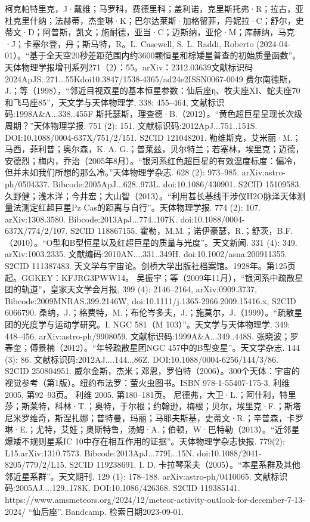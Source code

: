 \begin{enumerate}
 柯克帕特里克，J·戴维；马罗科，费德里科；盖利诺，克里斯托弗·R；拉古，亚杜克里什纳；法赫蒂，杰奎琳·K；巴尔达莱斯·加格留菲，丹妮拉·C；舒尔，史蒂文·D；阿普斯，凯文；施耐德，亚当·C；迈斯纳，亚伦·M；库赫纳，马克·J；卡塞尔登，丹；斯马特，R。L. Casewell, S. L. Raddi, Roberto (2024-04-01）。“基于全天空20秒差距范围内约3600颗恒星和棕矮星普查的初始质量函数”。天体物理学报增刊系列271（2）：55。arXiv：2312.03639文献标识码2024ApJS..271...55Kdoi10.3847/1538-4365/ad24e2ISSN0067-0049
 费尔南德斯，J.；等（1998），“邻近目视双星的基本恒星参数：仙后座η、牧夫座XI、蛇夫座70和飞马座85”，天文学与天体物理学, 338: 455–464, 文献标识码:1998A&A...338..455F
 斯托瑟斯，理查德·B.（2012）。“黄色超巨星呈现长次级周期？”天体物理学报. 751 (2): 151. 文献标识码:2012ApJ...751..151S. DOI:10.1088/0004-637X/751/2/151. S2CID 121048201.
 勒维斯克，艾米丽·M.；马西，菲利普；奥尔森，K. A. G.；普莱兹，贝尔特兰；若塞林，埃里克；迈德，安德烈；梅内，乔治（2005年8月）。“银河系红色超巨星的有效温度标度：偏冷，但并未如我们所想的那么冷。”天体物理学杂志. 628 (2): 973–985. arXiv:astro-ph/0504337. Bibcode:2005ApJ...628..973L. doi:10.1086/430901. S2CID 15109583.
 久野健；浅木洋；今井宏；大山智（2013）。“利用甚长基线干涉仪H2O脉泽天体测量法测定红超巨星Pz Cas的距离与自行”。天体物理学报. 774 (2): 107. arXiv:1308.3580. Bibcode:2013ApJ...774..107K. doi:10.1088/0004-637X/774/2/107. S2CID 118867155.
 霍勒，M.M.；诺伊豪瑟，R.；舒茨，B.F.（2010）。“O型和B型恒星以及红超巨星的质量与光度”。天文新闻. 331 (4): 349. arXiv:1003.2335. 文献编码:2010AN....331..349H. doi:10.1002/asna.200911355. S2CID 111387483.
 天文学与宇宙论。剑桥大学出版社档案馆。1928年。第125页起。GGKEY：KFJRG3PWW14。
 吴振宇；等（2009年11月），“银河系中疏散星团的轨道”，皇家天文学会月报, 399 (4): 2146–2164, arXiv:0909.3737, Bibcode:2009MNRAS.399.2146W, doi:10.1111/j.1365-2966.2009.15416.x, S2CID 6066790.
 桑纳，J.；格费特，M.；布伦岑多夫，J.；施莫尔，J.（1999）。“疏散星团的光度学与运动学研究。I. NGC 581（M 103）”。天文学与天体物理学. 349: 448–456. arXiv:astro-ph/9908059. 文献标识码:1999A&A...349..448S.
 张晓波；罗春奎；傅景楠（2012）。“年轻疏散星团NGC 457中的B型变星”。天文学杂志. 144 (3): 86. 文献标识码:2012AJ....144...86Z. DOI:10.1088/0004-6256/144/3/86. S2CID 250804951.
 威尔金斯，杰米；邓恩，罗伯特（2006）。300个天体：宇宙的视觉参考（第1版）。纽约布法罗：萤火虫图书。ISBN 978-1-55407-175-3.
 利维 2005, 第92–93页。
 利维 2005, 第180–181页。
 尼德弗，大卫·L.；阿什利，特里莎；斯莱特，科林·T.；奥特，于尔根；约翰逊，梅根；贝尔，埃里克·F.；斯塔尼米罗维奇，斯涅扎娜；普特曼，玛丽；马耶夫斯基，史蒂文·R.；辛普森，卡罗琳·E.；尤特，艾娃；奥斯特鲁，汤姆·A.；伯顿，W·巴特勒（2013）。“近邻星爆矮不规则星系IC 10中存在相互作用的证据”。天体物理学杂志快报. 779(2): L15.arXiv:1310.7573. Bibcode:2013ApJ...779L..15N. doi:10.1088/2041-8205/779/2/L15. S2CID 119238691.
 I. D. 卡拉琴采夫（2005）。“本星系群及其他邻近星系群”。天文期刊. 129 (1): 178–188. arXiv:astro-ph/0410065. 文献标识码:2005AJ....129..178K. DOI:10.1086/426368. S2CID 119385141.
 https://www.amsmeteors.org/2024/12/meteor-activity-outlook-for-december-7-13-2024/
 “仙后座”. Bandcamp. 检索日期2023-09-01.
\end{enumerate}
